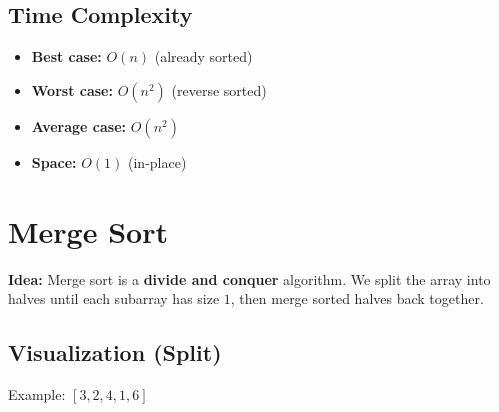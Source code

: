 \documentclass{article}
\begin{document}
\subsection{Time Complexity}
\begin{itemize}
  \item \textbf{Best case:} $O(n)$ (already sorted)
  \item \textbf{Worst case:} $O(n^2)$ (reverse sorted)
  \item \textbf{Average case:} $O(n^2)$
  \item \textbf{Space:} $O(1)$ (in-place)
\end{itemize}
\section{Merge Sort}

\textbf{Idea:} Merge sort is a \textbf{divide and conquer} algorithm.  
We split the array into halves until each subarray has size $1$, then merge sorted halves back together.

\subsection{Visualization (Split)}
Example: \([3,2,4,1,6]\)
\end{document}
